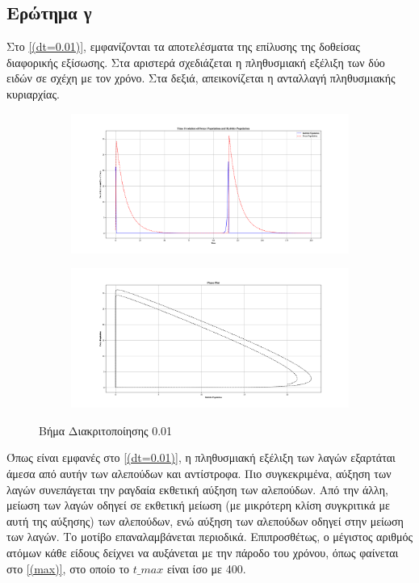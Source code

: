 \documentclass{article}
\begin{document}
\subsection{Ερώτημα γ}
Στο \autoref{(dt=0.01)}, εμφανίζονται τα αποτελέσματα της επίλυσης της δοθείσας διαφορικής εξίσωσης. Στα αριστερά σχεδιάζεται η πληθυσμιακή εξέλιξη των δύο ειδών σε σχέχη με τον χρόνο. Στα δεξιά, απεικονίζεται η ανταλλαγή πληθυσμιακής κυριαρχίας.
\vspace*{\fill}
\begin{figure}[H]
    \centering
	\begin{adjustbox}{center}

		\begin{subfigure}[c]{0.8\textwidth}    
			\includegraphics[width=1\textwidth,height=\textheight,keepaspectratio]{media/2/dt=0.01/Figure_1.png}
		\end{subfigure}
		
    	\begin{subfigure}[c]{.8\textwidth}
			\includegraphics[width=1\textwidth,height=\textheight,keepaspectratio]{media/2/dt=0.01/Figure_2.png}
		\end{subfigure}
	\end{adjustbox}
\caption{Βήμα Διακριτοποίησης 0.01}
\label{(dt=0.01)}
\end{figure}
\vspace*{\fill}
\newpage
\noindent
Όπως είναι εμφανές στο \autoref{(dt=0.01)}, η πληθυσμιακή εξέλιξη των λαγών εξαρτάται άμεσα από αυτήν των αλεπούδων και αντίστροφα. Πιο συγκεκριμένα, αύξηση των λαγών συνεπάγεται την ραγδαία εκθετική αύξηση των αλεπούδων. Από την άλλη, μείωση των λαγών οδηγεί σε εκθετική μείωση (με μικρότερη κλίση συγκριτικά με αυτή της αύξησης) των αλεπούδων, ενώ αύξηση των αλεπούδων οδηγεί στην μείωση των λαγών. Το μοτίβο επαναλαμβάνεται περιοδικά. Επιπροσθέτως, ο μέγιστος αριθμός ατόμων κάθε είδους δείχνει να αυξάνεται με την πάροδο του χρόνου, όπως φαίνεται στο \autoref{(max)}, στο οποίο το $ t\_{max} $ είναι ίσο με 400.
\end{document}
